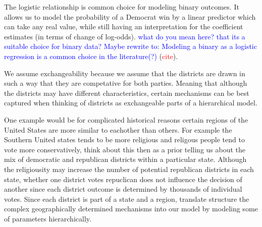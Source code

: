 \documentclass[12pt]{article}
\newcommand{\blue}[1]{\textcolor{blue}{#1}}
\begin{document}
The logistic relationship is common choice for modeling binary outcomes. It allows us to model the probability of a Democrat win by a linear predictor which can take any real value, while still having an interpretation for the coefficient estimates (in terms of change of log-odds).
\blue{what do you mean here? that its a suitable choice for binary data? Maybe rewrite to: Modeling a binary as a logistic regression is a common choice in the literature(?) } (\textcolor{red}{cite}).

We assume exchangeability because  we assume that the districts are drawn in such a way that they are competative for both parties. Meaning that although the districts may have different characteristics, certain mechanisms can be best captured when thinking of districts as exchangeable parts of  a hierarchical model. 

One example would be for complicated historical reasons certain regions of the United States are more similar to eachother than others. For example the Southern United states tends to be more religious and religous people tend to vote more conservatively, think about this then as a prior telling us about the mix of democratic and republican districts within a particular state. Although the religiousity may increase the number of potential republican districts in each state, whether one district votes repuclican does not influence the decision of another since each district outcome is determined by thousands of individual votes. 
Since each district is part of a state and a region, translate structure the complex geographically determined mechanisms into our model by modeling some of parameters hierarchically.

\end{document}
